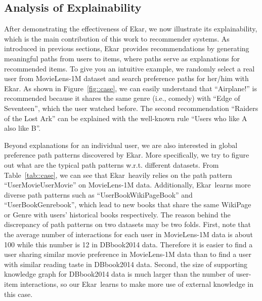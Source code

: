 \documentclass{article}
\newcommand{\name}{Ekar}
\begin{document}
\subsection{Analysis of Explainability}
After demonstrating the effectiveness of \name, we now illustrate its explainability, which is the main contribution of this work to recommender systems. As introduced in previous sections, \name\ provides recommendations by generating meaningful paths from users to items, where paths serve as explanations for recommended items. To give you an intuitive example, we randomly select a real user from MovieLens-1M dataset and search preference paths for her/him with \name. As shown in Figure~\ref{fig::case}, we can easily understand that ``Airplane!'' is recommended because it shares the same genre (i.e., comedy) with ``Edge of Seventeen'', which the user watched before. The second recommendation ``Raiders of the Lost Ark'' can be explained with the well-known rule ``Users who like A also like B''. 



Beyond explanations for an individual user, we are also interested in global preference path patterns discovered by \name. More specifically, we try to figure out what are the typical path patterns w.r.t. different datasets.
From Table~\ref{tab::case}, we can see that \name\ heavily relies on the path pattern ``UserMovieUserMovie'' on MovieLens-1M data. Additionally, \name\ learns more diverse path patterns such as ``UserBookWikiPageBook'' and ``UserBookGenrebook'', which lead to new books that share the same WikiPage or Genre with users' historical books respectively. The reason behind the discrepancy of path patterns on two datasets may be two folds. First, note that the average number of interactions for each user in MovieLens-1M data is about 100 while this number is 12 in DBbook2014 data. Therefore it is easier to find a user sharing similar movie preference in MovieLens-1M data than to find a user with similar reading taste in DBbook2014 data. 
Second, the size of supporting knowledge graph for DBbook2014 data is much larger than the number of user-item interactions, so our \name\ learns to make more use of external knowledge in this case.
\end{document}
